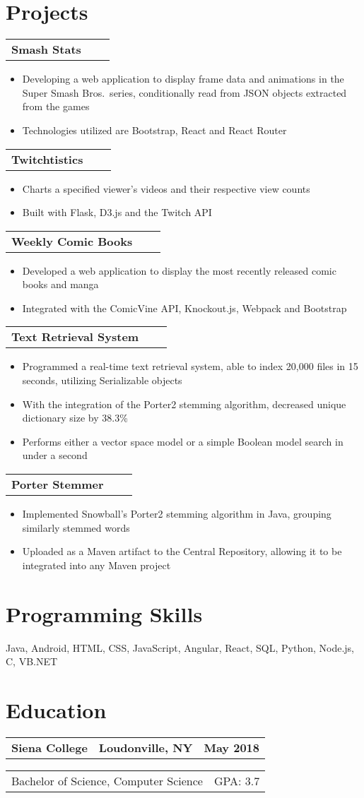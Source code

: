 \documentclass[letterpaper,11pt]{article}
\makeatletter
\newcommand{\resumeItem}[1]{
  \item\small{#1}
  \vspace{-2pt}
}
\newcommand{\resumeSubheading}[3]{
  \begin{tabular*}{\textwidth}{l@{\extracolsep{\fill}}c@{\extracolsep{\fill}}r}
    \textbf{#1} & \textbf{#2} & \textbf{#3}
  \end{tabular*}
  \vspace{-17pt}
}
\newcommand{\resumeSubSubheading}[2]{
    \begin{tabular*}{\textwidth}{l@{\extracolsep{\fill}}r}
      #1 & #2 \\
    \end{tabular*}
  }
\newcommand{\resumeItemListStart}{\begin{itemize}}
\newcommand{\resumeItemListEnd}{\end{itemize}\vspace{-5pt}}
\makeatother
\begin{document}
\section{Projects}
  \resumeSubheading{Smash Stats}{}{}
    \resumeItemListStart
      \resumeItem{Developing a web application to display frame data and animations in the Super Smash Bros.\ series, conditionally read from JSON objects extracted from the games}
      \resumeItem{Technologies utilized are Bootstrap, React and React Router}
    \resumeItemListEnd

  \resumeSubheading{Twitchtistics}{}{}
    \resumeItemListStart
      \resumeItem{Charts a specified viewer's videos and their respective view counts}
      \resumeItem{Built with Flask, D3.js and the Twitch API}
    \resumeItemListEnd
  
  \resumeSubheading{Weekly Comic Books}{}{}
    \resumeItemListStart
      \resumeItem{Developed a web application to display the most recently released comic books and manga}
      \resumeItem{Integrated with the ComicVine API, Knockout.js, Webpack and Bootstrap}
    \resumeItemListEnd

  \resumeSubheading{Text Retrieval System}{}{}
    \resumeItemListStart
      \resumeItem{Programmed a real-time text retrieval system, able to index 20,000 files in 15 seconds, utilizing Serializable objects}
      \resumeItem{With the integration of the Porter2 stemming algorithm, decreased unique dictionary size by 38.3\%}
      \resumeItem{Performs either a vector space model or a simple Boolean model search in under a second}
    \resumeItemListEnd

  \resumeSubheading{Porter Stemmer}{}{}
    \resumeItemListStart
      \resumeItem{Implemented Snowball's Porter2 stemming algorithm in Java, grouping similarly stemmed words}
      \resumeItem{Uploaded as a Maven artifact to the Central Repository, allowing it to be integrated into any Maven project}
    \resumeItemListEnd


\section{Programming Skills}
  \small{Java, Android, HTML, CSS, JavaScript, Angular, React, SQL, Python, Node.js, C, VB.NET}

\section{Education}
  \resumeSubheading{Siena College}{Loudonville, NY}{May 2018}
    \resumeSubSubheading{Bachelor of Science, Computer Science}{GPA: 3.7}

\end{document}
